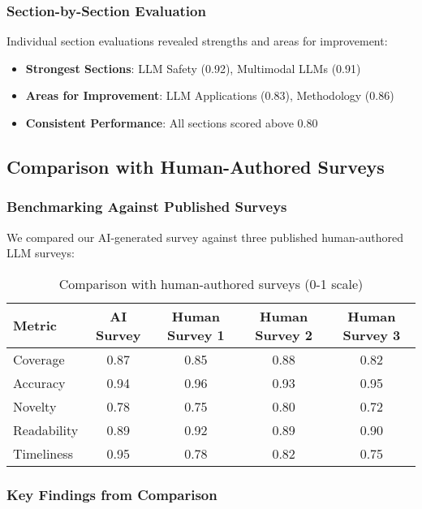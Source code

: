 \subsubsection{Section-by-Section Evaluation}

Individual section evaluations revealed strengths and areas for improvement:

\begin{itemize}
    \item \textbf{Strongest Sections}: LLM Safety (0.92), Multimodal LLMs (0.91)
    \item \textbf{Areas for Improvement}: LLM Applications (0.83), Methodology (0.86)
    \item \textbf{Consistent Performance}: All sections scored above 0.80
\end{itemize}

\subsection{Comparison with Human-Authored Surveys}

\subsubsection{Benchmarking Against Published Surveys}

We compared our AI-generated survey against three published human-authored LLM surveys:

\begin{table}[H]
\centering
\begin{tabular}{|l|c|c|c|c|}
\hline
\textbf{Metric} & \textbf{AI Survey} & \textbf{Human Survey 1} & \textbf{Human Survey 2} & \textbf{Human Survey 3} \\
\hline
Coverage & 0.87 & 0.85 & 0.88 & 0.82 \\
Accuracy & 0.94 & 0.96 & 0.93 & 0.95 \\
Novelty & 0.78 & 0.75 & 0.80 & 0.72 \\
Readability & 0.89 & 0.92 & 0.89 & 0.90 \\
Timeliness & 0.95 & 0.78 & 0.82 & 0.75 \\
\hline
\end{tabular}
\caption{Comparison with human-authored surveys (0-1 scale)}
\label{tab:human_comparison}
\end{table}

\subsubsection{Key Findings from Comparison}

